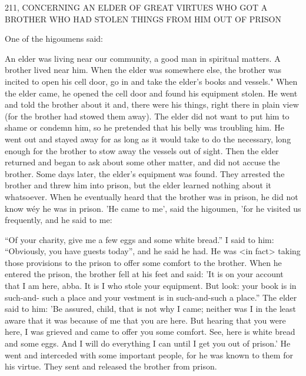 211, CONCERNING AN ELDER
OF GREAT VIRTUES WHO GOT
A BROTHER WHO HAD STOLEN THINGS
FROM HIM OUT OF PRISON

One of the higoumens said:

An elder was living near our community, a good man in spiritual
matters.
A brother lived near him.
When the elder was somewhere
else, the brother was incited to open his cell door, go in and take
the elder's books and vessels." When the elder came, he opened the
cell door and found his equipment stolen.
He went and told the
brother about it and, there were his things, right there in plain view
(for the brother had stowed them away).
The elder did not want to
put him to shame or condemn him, so he pretended that his belly
was troubling him.
He went out and stayed away for as long as it
would take to do the necessary, long enough for the brother to stow
away the vessels out of sight.
Then the elder returned and began to
ask about some other matter, and did not accuse the brother.
Some
days later, the elder's equipment was found.
They arrested the
brother and threw him into prison, but the elder learned nothing
about it whatsoever.
When he eventually heard that the brother was
in prison, he did not know wéy he was in prison.
'He came to me',
said the higoumen, 'for he visited us frequently, and he said to me:

“Of your charity, give me a few eggs and some white bread.” I said
to him: “Obviously, you have guests today”, and he said he had.
He
was <in fact> taking those provisions to the prison to offer some
comfort to the brother.
When he entered the prison, the brother fell
at his feet and said: 'It is on your account that I am here, abba.
It
is I who stole your equipment.
But look: your book is in such-and-
such a place and your vestment is in such-and-such a place.” The
elder said to him: 'Be assured, child, that is not why I came; neither
was I in the least aware that it was because of me that you are here.
But hearing that you were here, I was grieved and came to offer you
some comfort.
See, here is white bread and some eggs.
And I will
do everything I can until I get you out of prison.' He went and
interceded with some important people, for he was known to them
for his virtue.
They sent and released the brother from prison.

